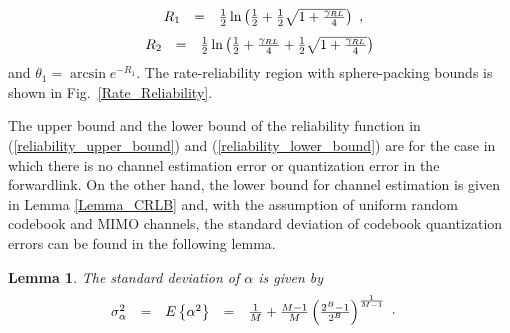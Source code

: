 \documentclass[10pt,fleqn, twocolumn]{IEEEtran}
\newtheorem{lemma}{Lemma}
\begin{document}
\begin{equation}\hspace{-0.0in}
\begin{array}{rcl}
R_{1}&=&\frac{1}{2}\ln\left(\frac{1}{2}+\frac{1}{2}\sqrt{1+\frac{\gamma_{\mbox{\tiny
RL}}}{4}}\right)
\end{array},
\end{equation}
\begin{equation}\hspace{-0.0in}
\begin{array}{rcl}
R_{2}&=&\frac{1}{2}\ln\left(\frac{1}{2}+\frac{\gamma_{\mbox{\tiny
RL}}}{4}+\frac{1}{2}\sqrt{1+\frac{\gamma_{\mbox{\tiny
RL}}}{4}}\right)
\end{array}
\end{equation}
\noindent and $\theta_{1}=\arcsin e^{-R_{1}}$. The
rate-reliability region with sphere-packing bounds is shown in
Fig.~\ref{Rate_Reliability}.

\begin{figure}
\end{figure}

The upper bound and the lower bound of the reliability function in
(\ref{reliability_upper_bound}) and
(\ref{reliability_lower_bound}) are for the case in which there is
no channel estimation error or quantization error in the
forwardlink. On the other hand, the lower bound for channel
estimation is given in Lemma \ref{Lemma_CRLB} and, with the
assumption of uniform random codebook and MIMO channels, the
standard deviation of codebook quantization errors can be found in
the following lemma.
\begin{lemma} The standard deviation
of $\alpha$ is given by
\begin{equation}\hspace{-0.2in}
\begin{array}{rcccl}
\sigma_{\alpha}^2&=&\mbox{E}\left\{\alpha^2\right\}&=&\frac{1}{M}+\frac{M-1}{M}\left(\frac{2^B-1}{2^B}\right)^{\frac{1}{M-1}}
\end{array}.\label{sigma_alpha}
\end{equation}
\end{lemma}
\end{document}
